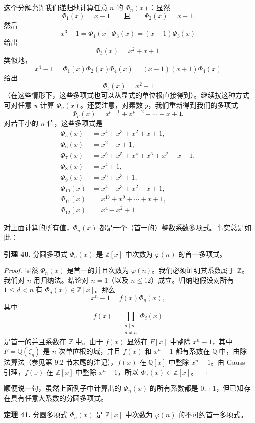 这个分解允许我们递归地计算任意 $n$ 的 $\Phi_n(x)$：显然
\[
\Phi_1(x)=x-1\qquad\text{且}\qquad \Phi_2(x)=x+1.
\]
然后
\[
x^3-1=\Phi_1(x)\Phi_3(x)=(x-1)\Phi_3(x)
\]
给出
\[
\Phi_3(x)=x^2+x+1.
\]
类似地，
\[
x^4-1=\Phi_1(x)\Phi_2(x)\Phi_4(x)=(x-1)(x+1)\Phi_4(x)
\]
给出
\[
\Phi_4(x)=x^2+1
\]
（在这些情形下，这些多项式也可以从显式的单位根直接得到）。继续按这种方式可对任意 $n$ 计算 $\Phi_n(x)$。还要注意，对素数 $p$，我们重新得到我们的多项式
\[
\Phi_p(x)=x^{p-1}+x^{p-2}+\cdots+x+1.
\]
对若干小的 $n$ 值，这些多项式是
\[
\begin{aligned}
	\Phi_5(x)&=x^4+x^3+x^2+x+1,\\
	\Phi_6(x)&=x^2-x+1,\\
	\Phi_7(x)&=x^6+x^5+x^4+x^3+x^2+x+1,\\
	\Phi_8(x)&=x^4+1,\\
	\Phi_9(x)&=x^6+x^3+1,\\
	\Phi_{10}(x)&=x^4-x^3+x^2-x+1,\\
	\Phi_{11}(x)&=x^{10}+x^9+\cdots+x+1,\\
	\Phi_{12}(x)&=x^4-x^2+1.
\end{aligned}
\]

对上面计算的所有值，$\Phi_n(x)$ 都是一个（首一的）整数系数多项式。事实总是如此：

\noindent\textbf{引理 40.} 分圆多项式 $\Phi_n(x)$ 是 $\mathbb Z[x]$ 中次数为 $\varphi(n)$ 的首一多项式。

\begin{proof}
	显然 $\Phi_n(x)$ 是首一的并且次数为 $\varphi(n)$。我们必须证明其系数属于 $\mathbb Z$。我们对 $n$ 用归纳法。结论对 $n=1$（以及 $n\leq12$）成立。归纳地假设对所有 $1\leq d<n$ 有 $\Phi_d(x)\in\mathbb Z[x]$。那么
	\[
	x^n-1=f(x)\Phi_n(x),
	\]
	其中
	\[
	f(x)=\prod_{\substack{d\mid n\\ d\neq n}}\Phi_d(x)
	\]
	是首一的并且系数在 $\mathbb Z$ 中。由于 $f(x)$ 显然在 $F[x]$ 中整除 $x^n-1$，其中 $F=\mathbb Q(\zeta_n)$ 是 $n$ 次单位根的域，并且 $f(x)$ 和 $x^n-1$ 都有系数在 $\mathbb Q$ 中，由除法算法（参见第 9.2 节末尾的注记），$f(x)$ 在 $\mathbb Q[x]$ 中整除 $x^n-1$。由 Gauss 引理，$f(x)$ 在 $\mathbb Z[x]$ 中整除 $x^n-1$，所以 $\Phi_n(x)\in\mathbb Z[x]$。
\end{proof}

顺便说一句，虽然上面例子中计算出的 $\Phi_n(x)$ 的所有系数都是 $0,\pm1$，但已知存在具有任意大系数的分圆多项式。

\noindent\textbf{定理 41.} 分圆多项式 $\Phi_n(x)$ 是 $\mathbb Z[x]$ 中次数为 $\varphi(n)$ 的不可约首一多项式。

